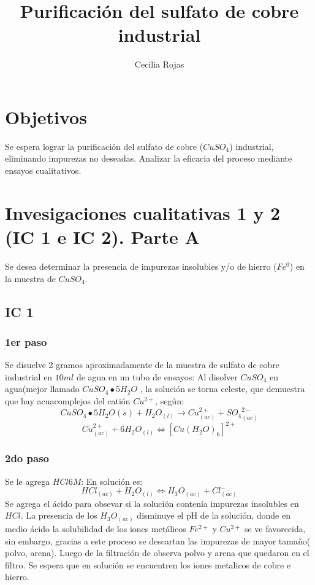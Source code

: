 \documentclass[a4paper,12pt]{article}
\title{Purificación del sulfato de cobre industrial}
\author{Cecilia Rojas}
\begin{document}
 

\maketitle


\section{Objetivos}
Se espera lograr la purificación del sulfato de cobre ($CuSO_4$) industrial, eliminando impurezas no deseadas. Analizar la eficacia del proceso mediante ensayos cualitativos.

\section{Invesigaciones cualitativas 1 y 2 (IC 1 e IC 2). Parte A}
Se desea determinar la presencia de impurezas insolubles y/o de hierro ($Fe^0$) en la muestra de $CuSO_4$.

\subsection{IC 1}
\subsubsection{1er paso}Se disuelve 2 gramos aproximadamente de la muestra de sulfato de cobre industrial en $10ml$ de agua en un tubo de ensayos: Al disolver $CuSO_4$ en agua(mejor llamado $CuSO_4\bullet5H_2O$ , la solución se torna celeste, que demuestra que hay acuacomplejos del catión $Cu^{2+}$, según:
$$CuSO_4\bullet 5 H_2O{(s)} + H_2O_{(l)}\to Cu^{2+}_{(ac)} + {SO_4}^{2-}_{(ac)}$$
$$Cu^{2+}_{(ac)} + 6H_2O_{(l)}\Leftrightarrow [Cu(H_2O)_6]^{2+}$$
\subsubsection{2do paso}Se le agrega $HCl 6M$: En solución es:
$$HCl_{(ac)} +  H_2O_{(l)} \Leftrightarrow H_3O_{(ac)} + Cl^{-}_{(ac)}$$
 Se agrega el ácido para obsevar si la solución contenía impurezas insolubles en $HCl$. La presencia de los $H_3O_{(ac)}$ disminuye el pH de la solución, donde en medio ácido la solubilidad de los iones metálicos $Fe^{2+}$ y $Cu^{2+}$ se ve favorecida, sin embargo, gracias a este proceso se descartan las impurezas de mayor tamaño( polvo, arena). Luego de la filtración de observa polvo y arena que quedaron en el filtro. Se espera que en solución se encuentren los iones metalicos de cobre e hierro.
\end{document}
